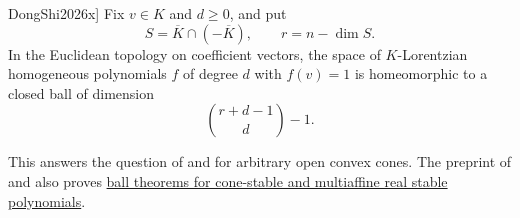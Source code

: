\begin{theorem}[Dong--Shi, \cite[Thm.~1.1]{DongShi2026x}]
Fix $v\in K$ and $d\geq0$, and put
\[
 S=\overline K\cap(-\overline K),\qquad r=n-\dim S.
\]
In the Euclidean topology on coefficient vectors, the space of
$K$-Lorentzian homogeneous polynomials $f$ of degree $d$ with $f(v)=1$
is homeomorphic to a closed ball of dimension
\[
 \binom{r+d-1}{d}-1.
\]
\end{theorem}

This answers the question of  and
 for arbitrary open convex cones.
The preprint of  and  also proves
\hyperref[stablePolynomialTopology]{ball theorems for cone-stable and
multiaffine real stable polynomials}.

